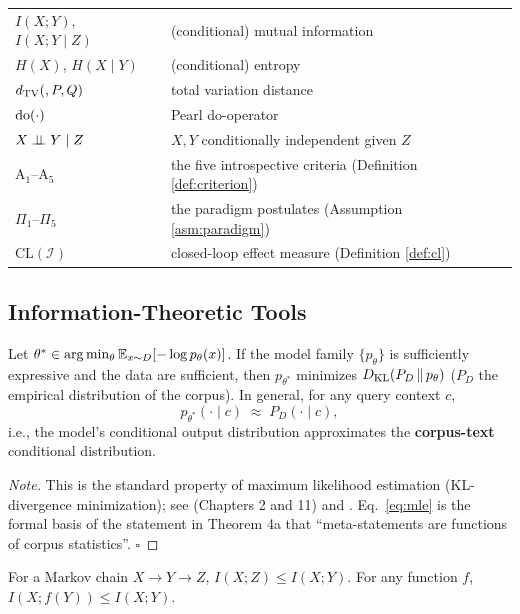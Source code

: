 \begin{table}[htbp]
\begin{tabular}{ll}
$I(X;Y)$, $I(X;Y\mid Z)$ & (conditional) mutual information \\
$H(X)$, $H(X\mid Y)$ & (conditional) entropy \\
$d_{\mathrm{TV}}\!\left(,P,Q\right)$ & total variation distance \\
$\operatorname{do}(\cdot)$ & Pearl do-operator\cite{pearl-2009} \\
$X \perp\!\!\!\perp Y \mid Z$ & $X, Y$ conditionally independent given $Z$ \\
$\mathrm{A}_1$--$\mathrm{A}_5$ & the five introspective criteria (Definition \ref{def:criterion}) \\
$\Pi_1$--$\Pi_5$ & the paradigm postulates (Assumption \ref{asm:paradigm}) \\
$\mathrm{CL}(\mathcal{I})$ & closed-loop effect measure (Definition \ref{def:cl}) \\
\bottomrule
\end{tabular}
\end{table}

\subsection{Information-Theoretic Tools}

\begin{lemma}\label{lem:mle}
Let $\theta^{*} \in \arg\min_\theta \mathbb{E}_{x \sim D}[-\log p_\theta(x)]$. If the model family
$\{p_\theta\}$ is sufficiently expressive and the data are sufficient, then $p_{\theta^{*}}$
minimizes $D_{\mathrm{KL}}\!\left(P_D\,\|\,p_\theta\right)$ ($P_D$ the empirical distribution of the corpus). In general,
for any query context $c$,
\begin{equation}
p_{\theta^{*}}(\cdot \mid c) \;\approx\; P_D(\cdot \mid c),
\label{eq:mle}
\end{equation}
i.e., the model's conditional output distribution approximates the \textbf{corpus-text}
conditional distribution.
\end{lemma}

\begin{proof}[Note]
This is the standard property of maximum likelihood estimation (KL-divergence minimization);
see \cite{cover-thomas-2006} (Chapters 2 and 11) and \cite{shannon-1948}. Eq.~\eqref{eq:mle}
is the formal basis of the statement in Theorem 4a that ``meta-statements are functions of
corpus statistics''. $\square$
\end{proof}

\begin{lemma}\label{lem:dpi}
For a Markov chain $X \to Y \to Z$, $I(X;Z) \le I(X;Y)$.
For any function $f$, $I(X; f(Y)) \le I(X;Y)$. \cite{cover-thomas-2006}
\end{lemma}

